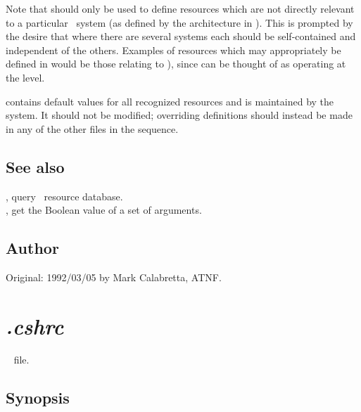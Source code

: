 Note that  should only be used to define resources
which are not directly relevant to a particular \aipspp\ system (as defined by
the architecture in ).  This is prompted by the desire that
where there are several systems each should be self-contained and independent
of the others.  Examples of resources which may appropriately be defined in
 would be those relating to ), since
 can be thought of as operating at the 
level.

 contains default values for all recognized resources
and is maintained by the system.  It should not be modified; overriding
definitions should instead be made in any of the other  files in
the sequence.

\subsection*{See also}

, query \aipspp\ resource database.\\
, get the Boolean value of a set of arguments.\\

\subsection*{Author}

Original: 1992/03/05 by Mark Calabretta, ATNF.


\newpage
\section{\textit{.cshrc}}
\label{.cshrc}

\aipspp\  file.

\subsection*{Synopsis}

\begin{synopsis}
\end{synopsis}

